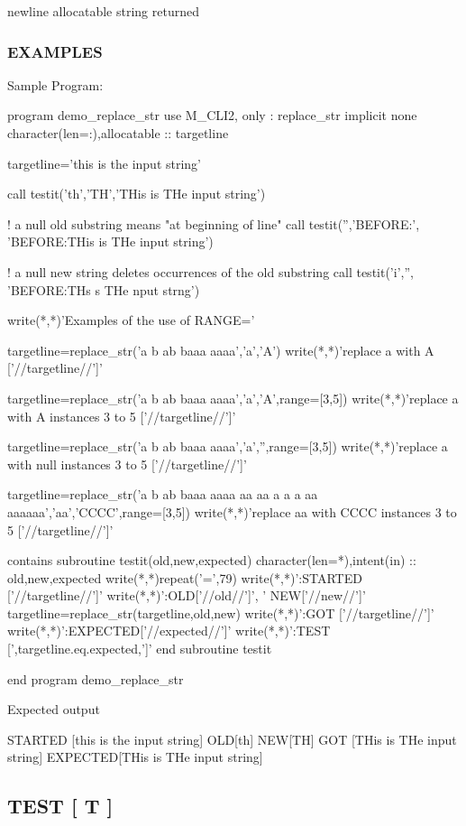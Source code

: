 newline allocatable string returned

\subsubsection*{E\+X\+A\+M\+P\+L\+ES}

Sample Program\+: \begin{DoxyVerb}  program demo_replace_str
  use M_CLI2, only : replace_str
  implicit none
  character(len=:),allocatable :: targetline

  targetline='this is the input string'

  call testit('th','TH','THis is THe input string')

  ! a null old substring means "at beginning of line"
  call testit('','BEFORE:', 'BEFORE:THis is THe input string')

  ! a null new string deletes occurrences of the old substring
  call testit('i','', 'BEFORE:THs s THe nput strng')

  write(*,*)'Examples of the use of RANGE='

  targetline=replace_str('a b ab baaa aaaa','a','A')
  write(*,*)'replace a with A ['//targetline//']'

  targetline=replace_str('a b ab baaa aaaa','a','A',range=[3,5])
  write(*,*)'replace a with A instances 3 to 5 ['//targetline//']'

  targetline=replace_str('a b ab baaa aaaa','a','',range=[3,5])
  write(*,*)'replace a with null instances 3 to 5 ['//targetline//']'

  targetline=replace_str('a b ab baaa aaaa aa aa a a a aa aaaaaa','aa','CCCC',range=[3,5])
  write(*,*)'replace aa with CCCC instances 3 to 5 ['//targetline//']'

  contains
  subroutine testit(old,new,expected)
  character(len=*),intent(in) :: old,new,expected
  write(*,*)repeat('=',79)
  write(*,*)':STARTED ['//targetline//']'
  write(*,*)':OLD['//old//']', ' NEW['//new//']'
  targetline=replace_str(targetline,old,new)
  write(*,*)':GOT     ['//targetline//']'
  write(*,*)':EXPECTED['//expected//']'
  write(*,*)':TEST    [',targetline.eq.expected,']'
  end subroutine testit

  end program demo_replace_str
\end{DoxyVerb}


Expected output 

 S\+T\+A\+R\+T\+ED \mbox{[}this is the input string\mbox{]} O\+LD\mbox{[}th\mbox{]} N\+EW\mbox{[}TH\mbox{]} G\+OT \mbox{[}T\+His is T\+He input string\mbox{]} E\+X\+P\+E\+C\+T\+ED\mbox{[}T\+His is T\+He input string\mbox{]} \subsection*{T\+E\+ST \mbox{[} T \mbox{]} }

